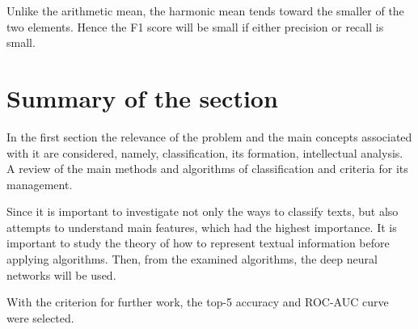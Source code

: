 Unlike the arithmetic mean, the harmonic mean tends toward the smaller of the two elements. Hence the F1 score will be small if either precision or recall is small.

\section{Summary of the section}

In the first section the relevance of the problem and the main concepts associated with it are considered, namely, classification, its formation, intellectual analysis. A review of the main methods and algorithms of classification and criteria for its management.

Since it is important to investigate not only the ways to classify texts, but also attempts to understand main features, which had the highest importance. It is important to study the theory of how to represent textual information before applying algorithms. Then, from the examined algorithms, the deep neural networks will be used. 

With the criterion for further work, the top-5 accuracy and ROC-AUC curve were selected.
